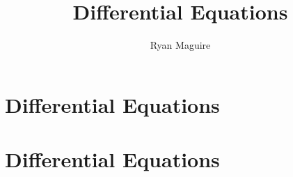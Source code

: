 \documentclass[crop=false,class=book,oneside]{standalone}
\begin{document}
    \ifx\ifmathcourses\undefined
        \title{Differential Equations}
        \author{Ryan Maguire}
        \date{\vspace{-5ex}}
        \maketitle
        \tableofcontents
        \chapter*{Differential Equations}
        \setcounter{chapter}{1}
    \else
        \chapter{Differential Equations}
    \fi
\end{document}
